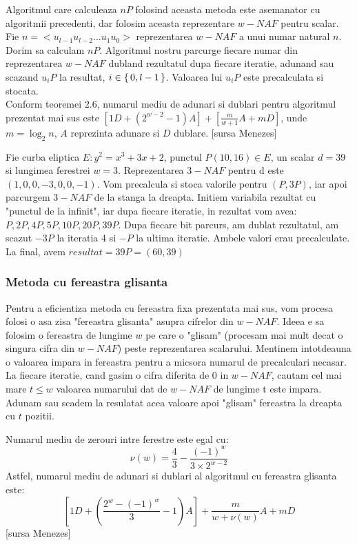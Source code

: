 Algoritmul care calculeaza $nP$ folosind aceasta metoda este asemanator cu algoritmii precedenti, dar folosim aceasta reprezentare $w-NAF$ pentru scalar. Fie $n = <u_{l-1}u_{l-2}...u_1u_0>$ reprezentarea $w-NAF$ a unui numar natural $n$. Dorim sa calculam $nP$. Algoritmul nostru parcurge fiecare numar din reprezentarea $w-NAF$ dubland rezultatul dupa fiecare iteratie, adunand sau scazand $u_iP$ la resultat, $i\in \set{0, l-1}$. Valoarea lui $u_iP$ este precalculata si stocata. \\

Conform teoremei $2.6$, numarul mediu de adunari si dublari pentru algoritmul prezentat mai sus este $[1D + (2^{w-2} - 1) A] + [\frac{m}{w+1}A + mD]$, unde $m = \log_2 n$, $A$ reprezinta adunare si $D$ dublare. [sursa Menezes]

\begin{ex}
Fie curba eliptica $E: y^2 = x^3 + 3x + 2$, punctul $P(10, 16)\in E$, un scalar $d = 39$ si lungimea ferestrei $w=3$. Reprezentarea $3-NAF$ pentru d este $(1, 0, 0, -3, 0, 0, -1)$. Vom precalcula si stoca valorile pentru $(P, 3P)$, iar apoi parcurgem $3-NAF$ de la stanga la dreapta. Initiem variabila rezultat cu "punctul de la infinit", iar dupa fiecare iteratie, in rezultat vom avea: $P, 2P, 4P, 5P, 10P, 20P, 39P$. Dupa fiecare bit parcurs, am dublat rezultatul, am scazut $-3P$ la iteratia 4 si $-P$ la ultima iteratie. Ambele valori erau precalculate. La final, avem $resultat = 39P = (60, 39)$

\end{ex}

\subsubsection{Metoda cu fereastra glisanta}

    Pentru a eficientiza metoda cu fereastra fixa prezentata mai sus, vom procesa folosi o asa zisa "fereastra glisanta" asupra cifrelor din $w-NAF$. Ideea e sa folosim o fereastra de lungime $w$ pe care o "glisam" (procesam mai mult decat o singura cifra din $w-NAF$) peste reprezentarea scalarului. Mentinem intotdeauna o valoarea impara in fereastra pentru a micsora numarul de precalculari necasar. La fiecare iteratie, cand gasim o cifra diferita de $0$ in $w-NAF$, cautam cel mai mare $t \leq w$ valoarea numarului dat de $w-NAF$ de lungime t este impara. Adunam sau scadem la resulatat acea valoare apoi "glisam" fereastra la dreapta cu $t$ pozitii.
\begin{obs}
Numarul mediu de zerouri intre ferestre este egal cu:
$$\nu(w) = \frac{4}{3} - \frac{(-1)^w}{3\times 2^{w-2}}$$
Astfel, numarul mediu de adunari si dublari al algoritmul cu fereastra glisanta este:
$$[1D + (\frac{2^w - (-1)^w}{3} - 1)A] + \frac{m}{w + \nu(w)}A + mD$$
[sursa Menezes]
\end{obs}

